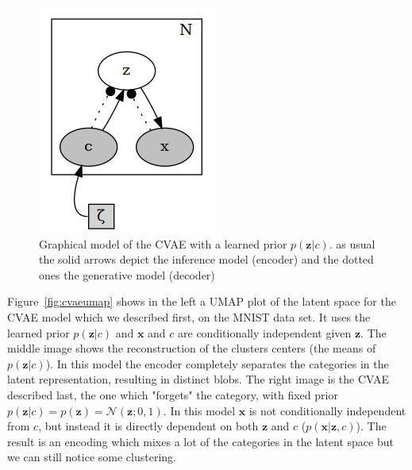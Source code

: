 \documentclass[11pt, a4paper]{report}
\theoremstyle{plain}
\theoremstyle{definition}
\theoremstyle{remark}
\newcommand{\x}{\mathbf{x}}
\newcommand{\z}{\mathbf{z}}
\newcommand{\NN}{\mathcal{N}}
\begin{document}
\begin{figure}[h]
\centering
\includegraphics[width=0.4 \textwidth]{plots/cvae.gv.png}
\caption{Graphical model of the CVAE with a learned prior $p(\z | c)$.
as usual the solid arrows depict the inference model (encoder) and the dotted
ones the generative model (decoder)}
\label{fig:cvae}
\end{figure}

Figure~\ref{fig:cvaeumap} shows in the left a UMAP plot of the latent space for
the CVAE model which we described first, on the MNIST data set.
It uses the learned prior $p(\z|c)$ and
$\x$ and $c$ are conditionally independent given $\z$.
The middle image shows the reconstruction of the clusters centers (the means of
$p(\z | c)$). In this model the encoder completely separates the categories in
the latent representation, resulting in distinct blobs.
The right image is the CVAE described last, the one which "forgets" the
category, with fixed prior $p(\z | c) = p(\z) = \NN(\z;0,1)$.
In this model $\x$ is not conditionally independent from $c$, but instead it 
is directly dependent on both $\z$ and $c$ ($p(\x | \z, c)$).
The result is an encoding which mixes a lot of the categories in the latent
space but we can still notice some clustering.
\end{document}
